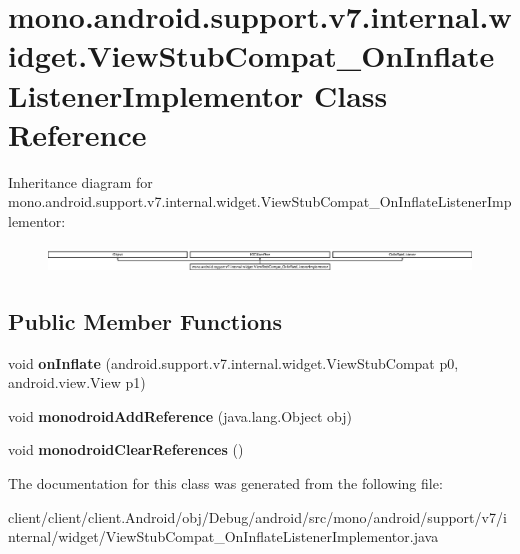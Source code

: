 \hypertarget{classmono_1_1android_1_1support_1_1v7_1_1internal_1_1widget_1_1ViewStubCompat__OnInflateListenerImplementor}{}\section{mono.\+android.\+support.\+v7.\+internal.\+widget.\+View\+Stub\+Compat\+\_\+\+On\+Inflate\+Listener\+Implementor Class Reference}
\label{classmono_1_1android_1_1support_1_1v7_1_1internal_1_1widget_1_1ViewStubCompat__OnInflateListenerImplementor}
Inheritance diagram for mono.\+android.\+support.\+v7.\+internal.\+widget.\+View\+Stub\+Compat\+\_\+\+On\+Inflate\+Listener\+Implementor\+:\begin{figure}[H]
\begin{center}
\leavevmode
\includegraphics[height=0.723514cm]{classmono_1_1android_1_1support_1_1v7_1_1internal_1_1widget_1_1ViewStubCompat__OnInflateListenerImplementor}
\end{center}
\end{figure}
\subsection*{Public Member Functions}
\begin{DoxyCompactItemize}
\item 
\hypertarget{classmono_1_1android_1_1support_1_1v7_1_1internal_1_1widget_1_1ViewStubCompat__OnInflateListenerImplementor_a7cdd2a3b4209fe8c7f895f20a63a55a4}{}void {\bfseries on\+Inflate} (android.\+support.\+v7.\+internal.\+widget.\+View\+Stub\+Compat p0, android.\+view.\+View p1)\label{classmono_1_1android_1_1support_1_1v7_1_1internal_1_1widget_1_1ViewStubCompat__OnInflateListenerImplementor_a7cdd2a3b4209fe8c7f895f20a63a55a4}

\item 
\hypertarget{classmono_1_1android_1_1support_1_1v7_1_1internal_1_1widget_1_1ViewStubCompat__OnInflateListenerImplementor_aed12e19e4199b3c9393f7f2571766d19}{}void {\bfseries monodroid\+Add\+Reference} (java.\+lang.\+Object obj)\label{classmono_1_1android_1_1support_1_1v7_1_1internal_1_1widget_1_1ViewStubCompat__OnInflateListenerImplementor_aed12e19e4199b3c9393f7f2571766d19}

\item 
\hypertarget{classmono_1_1android_1_1support_1_1v7_1_1internal_1_1widget_1_1ViewStubCompat__OnInflateListenerImplementor_ac25a7d049659fa46d64e6106edcdef54}{}void {\bfseries monodroid\+Clear\+References} ()\label{classmono_1_1android_1_1support_1_1v7_1_1internal_1_1widget_1_1ViewStubCompat__OnInflateListenerImplementor_ac25a7d049659fa46d64e6106edcdef54}

\end{DoxyCompactItemize}


The documentation for this class was generated from the following file\+:\begin{DoxyCompactItemize}
\item 
client/client/client.\+Android/obj/\+Debug/android/src/mono/android/support/v7/internal/widget/View\+Stub\+Compat\+\_\+\+On\+Inflate\+Listener\+Implementor.\+java\end{DoxyCompactItemize}
